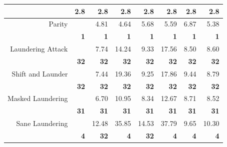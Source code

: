 \begin{figure}
\begin{table}[H]
\begin{tabular}{rr|rrrrrr}
                                      & \textbf{2.8} & \textbf{2.8} & \multicolumn{1}{r|}{\textbf{2.8}} & \textbf{2.8} & \multicolumn{1}{r|}{\textbf{2.8}} & \textbf{2.8}      & \textbf{2.8}     \\ \hline\hline
\multirow{2}{*}{Parity}               &              & 4.81         & \multicolumn{1}{r|}{4.64}         & 5.68         & \multicolumn{1}{r|}{5.59}         & 6.87              & 5.38             \\
                                      & \textbf{1}   & \textbf{1}   & \multicolumn{1}{r|}{\textbf{1}}   & \textbf{1}   & \multicolumn{1}{r|}{\textbf{1}}   & \textbf{1}        & \textbf{1}       \\ \hline
\multirow{2}{*}{Laundering Attack}    &              & 7.74         & \multicolumn{1}{r|}{14.24}        & 9.33         & \multicolumn{1}{r|}{17.56}        & 8.50              & 8.60             \\
                                      & \textbf{32}  & \textbf{32}  & \multicolumn{1}{r|}{\textbf{32}}  & \textbf{32}  & \multicolumn{1}{r|}{\textbf{32}}  & \textbf{32}       & \textbf{32}      \\ \hline
\multirow{2}{*}{Shift and Launder}    &              & 7.44         & \multicolumn{1}{r|}{19.36}        & 9.25         & \multicolumn{1}{r|}{17.86}        & 9.44              & 8.79             \\
                                      & \textbf{32}  & \textbf{32}  & \multicolumn{1}{r|}{\textbf{32}}  & \textbf{32}  & \multicolumn{1}{r|}{\textbf{32}}  & \textbf{32}       & \textbf{32}      \\ \hline
\multirow{2}{*}{Masked Laundering}    &              & 6.70         & \multicolumn{1}{r|}{10.95}        & 8.34         & \multicolumn{1}{r|}{12.67}        & 8.71              & 8.52             \\
                                      & \textbf{31}\footnotemark[3]  & \textbf{31}  & \multicolumn{1}{r|}{\textbf{31}}  & \textbf{31}  & \multicolumn{1}{r|}{\textbf{31}}  & \textbf{31}       & \textbf{31}      \\ \hline
\multirow{2}{*}{Sane Laundering}      &              & 12.48        & \multicolumn{1}{r|}{35.85}        & 14.53        & \multicolumn{1}{r|}{37.79}        & 9.65              & 10.30            \\
                                      & \textbf{4}   & \textbf{32}  & \multicolumn{1}{r|}{\textbf{4}}   & \textbf{32}  & \multicolumn{1}{r|}{\textbf{4}}   & \textbf{4}        & \textbf{4}       \\ \hline\hline

\end{tabular}
\end{table}
\end{figure}
